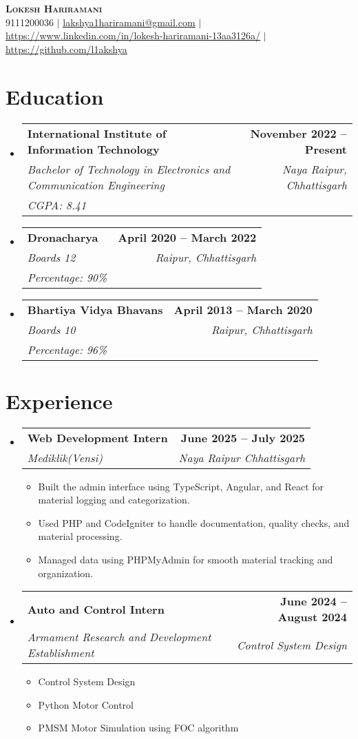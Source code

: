 \documentclass[letterpaper,11pt]{article}
\makeatletter
\newcommand{\resumeItem}[1]{
  \item\small{
    {#1 \vspace{-2pt}}
  }
}
\newcommand{\resumeEducation}[5]{
  \vspace{-2pt}\item
    \begin{tabular*}{\textwidth}{l@{\extracolsep{\fill}}r}
      \textbf{#1} & \textbf{#4} \\
      \textit{\small#3} & \textit{#2} \\
      \textit{#5} & \\
    \end{tabular*}\vspace{-7pt}
}
\newcommand{\resumeSubheading}[4]{
  \vspace{-2pt}\item
    \begin{tabular*}{\textwidth}{l@{\extracolsep{\fill}}r}
      \textbf{#1} & \textbf{#2} \\
      \textit{\small#3} & \textit{#4} \\
    \end{tabular*}\vspace{-7pt}
}
\newcommand{\resumeSubHeadingListStart}{\begin{itemize}[leftmargin=0.15in, label={}]}
\newcommand{\resumeSubHeadingListEnd}{\end{itemize}}
\newcommand{\resumeItemListStart}{\begin{itemize}}
\newcommand{\resumeItemListEnd}{\end{itemize}\vspace{-5pt}}
\makeatother
\begin{document}

\begin{center}
    \textbf{\Huge \scshape Lokesh Hariramani} \\ \vspace{1pt}
    \small 9111200036 $|$ \href{mailto:x@x.com}{\underline{lakshya1hariramani@gmail.com}} $|$ 
    \href{}{\underline{https://www.linkedin.com/in/lokesh-hariramani-13aa3126a/}} $|$
    \href{}{\underline{https://github.com/l1akshya}}
\end{center}

\section{Education}
\resumeSubHeadingListStart
    \resumeEducation
      {International Institute of Information Technology}
      {Naya Raipur, Chhattisgarh}
      {Bachelor of Technology in Electronics and Communication Engineering}
      {November 2022 -- Present}
      {CGPA: 8.41}
    \resumeEducation
      {Dronacharya}
      {Raipur, Chhattisgarh}
      {Boards 12}
      {April 2020 -- March 2022}
      {Percentage: 90\%}
    \resumeEducation
      {Bhartiya Vidya Bhavans}
      {Raipur, Chhattisgarh}
      {Boards 10}
      {April 2013 -- March 2020}
      {Percentage: 96\%}
\resumeSubHeadingListEnd



\section{Experience}
\resumeSubHeadingListStart
    \resumeSubheading
      {Web Development Intern}{June 2025 -- July 2025}
      {Mediklik(Vensi)}{Naya Raipur Chhattisgarh}
      \resumeItemListStart
        \resumeItem{ Built the admin interface using TypeScript, Angular, and React for material logging and categorization.}
        \resumeItem{Used PHP and CodeIgniter to handle documentation, quality checks, and material processing.}
        \resumeItem{ Managed data using PHPMyAdmin for smooth material tracking and organization.}
      \resumeItemListEnd
    \resumeSubheading
      {Auto and Control Intern}{June 2024 -- August 2024}
      {Armament Research and Development Establishment}{Control System Design}
      \resumeItemListStart
        \resumeItem{Control System Design}
        \resumeItem{Python Motor Control}
        \resumeItem{PMSM Motor Simulation using FOC algorithm}
      \resumeItemListEnd
\resumeSubHeadingListEnd
\end{document}
